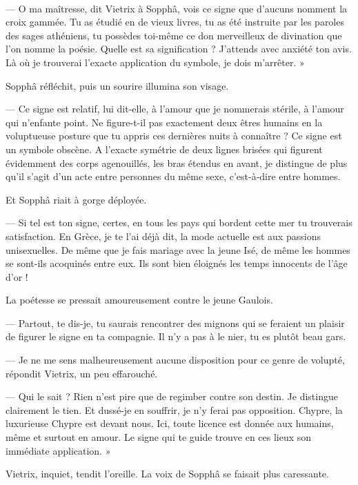 \documentclass[a4paper, 11pt, oneside, polutonikogreek, french]{article}
\begin{document}
\paragraph{}
--- O ma maîtresse, dit Vietrix à Sopphâ, vois ce signe que d'aucuns nomment la croix gammée. Tu as étudié en de vieux livres, tu as été instruite par les paroles des sages athéniens, tu possèdes toi-même ce don merveilleux de divination que l'on nomme la poésie. Quelle est sa signification ? J'attends avec anxiété ton avis. Là où je trouverai l'exacte application du symbole, je dois m'arrêter. »

Sopphâ réfléchit, puis un sourire illumina son visage.

--- Ce signe est relatif, lui dit-elle, à l'amour que je nommerais stérile, à l'amour qui n'enfante point. Ne figure-t-il pas exactement deux êtres humains en la voluptueuse posture que tu appris ces dernières nuits à connaître ? Ce signe est un symbole obscène. A l'exacte symétrie de deux lignes brisées qui figurent évidemment des corps agenouillés, les bras étendus en avant, je distingue de plus qu'il s'agit d'un acte entre personnes du même sexe, c'est-à-dire entre hommes.

Et Sopphâ riait à gorge déployée.

--- Si tel est ton signe, certes, en tous les pays qui bordent cette mer tu trouverais satisfaction. En Grèce, je te l'ai déjà dit, la mode actuelle est aux passions unisexuelles. De même que je fais mariage avec la jeune Isé, de même les hommes se sont-ils acoquinés entre eux. Ils sont bien éloignés les temps innocents de l'âge d'or !

La poétesse se pressait amoureusement contre le jeune Gaulois.

--- Partout, te dis-je, tu saurais rencontrer des mignons qui se feraient un plaisir de figurer le signe en ta compagnie. Il n'y a pas à le nier, tu es plutôt beau gars.

--- Je ne me sens malheureusement aucune disposition pour ce genre de volupté, répondit Vietrix, un peu effarouché.

--- Qui le sait ? Rien n'est pire que de regimber contre son destin. Je distingue clairement le tien. Et dussé-je en souffrir, je n'y ferai pas opposition. Chypre, la luxurieuse Chypre est devant nous. Ici, toute licence est donnée aux humains, même et surtout en amour. Le signe qui te guide trouve en ces lieux son immédiate application. »

Vietrix, inquiet, tendit l'oreille. La voix de Sopphâ se faisait plus caressante.
\end{document}
